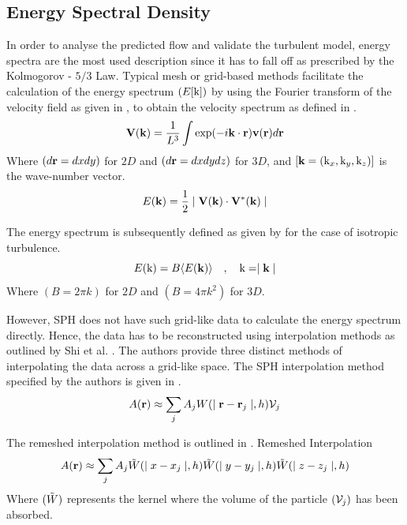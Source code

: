 \subsection{Energy Spectral Density}
In order to analyse the predicted flow and validate the turbulent model, energy spectra are the most used description since it has to fall off as prescribed by the  Kolmogorov - $5/3$ Law.
Typical mesh or grid-based methods facilitate the calculation of the energy spectrum $(E[\mathrm{k}])$ by using the Fourier transform of the velocity field as given in , to obtain the velocity spectrum as defined in .
\begin{equation}
    \mathbf{V}(\mathbf{k}) = \frac{1}{L^3} \int \exp(-i \mathbf{k} \cdot \mathbf{r}) \mathbf{v}(\mathbf{r}) d\mathbf{r}
    \label{eq:Shi2013-vel-FT}
\end{equation}
Where $(d\mathbf{r}=dxdy)$ for $2D$ and $(d\mathbf{r}=dxdydz)$ for $3D$, and $[\mathbf{k} = (\mathrm{k}_x, \mathrm{k}_y, \mathrm{k}_z)]$ is the wave-number vector.
\begin{equation}
    E(\mathbf{k}) = \frac{1}{2} \mid  \mathbf{V}(\mathbf{k}) \cdot \mathbf{V}^*(\mathbf{k})  \mid
    \label{eq:Shi2013-vel-spectrum}
\end{equation}

The energy spectrum is subsequently defined as given by  for the case of isotropic turbulence.
\begin{equation}
    E(\mathrm{k}) = B \langle E(\mathbf{k}) \rangle \quad , \quad \mathrm{k} = \mid \mathbf{k} \mid
    \label{eq:Shi2013-energy-spectrum}
\end{equation}
Where $(B=2\pi k)$ for $2D$ and $(B=4\pi k^2)$ for $3D$.

However, SPH does not have such grid-like data to calculate the energy spectrum directly. Hence, the data has to be reconstructed using interpolation methods as outlined by Shi et al. \parencite{Shi2013}.
The authors provide three distinct methods of interpolating the data across a grid-like space. 
The SPH interpolation method specified by the authors is given in .
\begin{equation}
    A(\mathbf{r}) \approx \sum_j A_j W(\mid \mathbf{r} - \mathbf{r}_j \mid, h) \mathcal{V}_j
    \label{eq:Shi2013-sph-interpolation}
\end{equation}

The remeshed interpolation method is outlined in .
Remeshed Interpolation
\begin{equation}
    A(\mathbf{r}) \approx \sum_j A_j \Tilde{W}(\mid x-x_j \mid, h) \Tilde{W}(\mid y-y_j \mid, h) \Tilde{W}(\mid z-z_j \mid, h)
    \label{eq:Shi2013-remeshed-interpolation}
\end{equation}
Where $(\Tilde{W})$ represents the kernel where the volume of the particle $(\mathcal{V}_j)$ has been absorbed.

